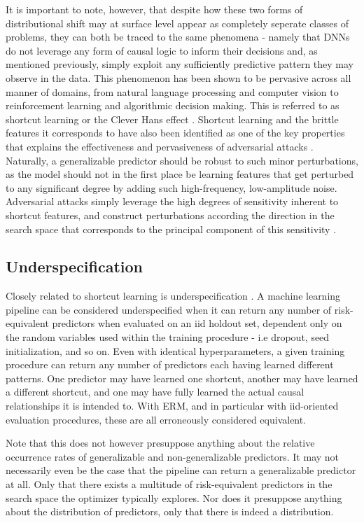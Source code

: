 		It is important to note, however, that despite how these two forms of distributional shift may at surface level appear as completely seperate classes of problems, they can both be traced to the same phenomena - namely that DNNs do not leverage any form of causal logic to inform their decisions and, as mentioned previously, simply exploit any sufficiently predictive pattern they may observe in the data. This phenomenon has been shown to be pervasive across all manner of domains, from natural language processing and computer vision to reinforcement learning and algorithmic decision making. This is referred to as shortcut learning \cite{shortcut_learning} or the Clever Hans effect \cite{cleverhans}. 
		Shortcut learning and the brittle features it corresponds to have also been identified as one of the key properties that explains the effectiveness and pervasiveness of adversarial attacks \cite{adversarial_bugs_features}. Naturally, a generalizable predictor should be robust to such minor perturbations, as the model should not in the first place be learning features that get perturbed to any significant degree by adding such high-frequency, low-amplitude noise. Adversarial attacks simply leverage the high degrees of sensitivity inherent to shortcut features, and construct perturbations according the direction in the search space that corresponds to the principal component of this sensitivity \cite{sensitivity}. 


	\subsection{Underspecification}
		Closely related to shortcut learning is underspecification \cite{damour2020underspecification}. A machine learning pipeline can be considered underspecified when it can return any number of risk-equivalent predictors when evaluated on an iid holdout set, dependent only on the random variables used within the training procedure - i.e dropout, seed initialization, and so on. Even with identical hyperparameters, a given training procedure can return any number of predictors each having learned different patterns. One predictor may have learned one shortcut, another may have learned a different shortcut, and one may have fully learned the actual causal relationships it is intended to. With ERM, and in particular with iid-oriented evaluation procedures, these are all erroneously considered equivalent. 

		Note that this does not however presuppose anything about the relative occurrence rates of generalizable and non-generalizable predictors. It may not necessarily even be the case that the pipeline can return a generalizable predictor at all. Only that there exists a multitude of risk-equivalent predictors in the search space the optimizer typically explores. Nor does it presuppose anything about the distribution of predictors, only that there is indeed a distribution. 

